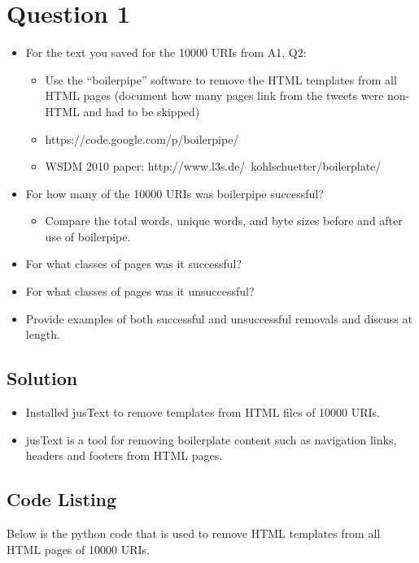 


\section{Question 1}
\label{part1}

\begin{itemize}
\item For the text you saved for the 10000 URIs from A1, Q2:
\begin{itemize}
\item Use the “boilerpipe” software to remove the HTML templates from all HTML pages (document how many pages link from the tweets were non-HTML and had to be skipped)
\item https://code.google.com/p/boilerpipe/
\item WSDM 2010 paper: http://www.l3s.de/~kohlschuetter/boilerplate/
\end{itemize}
\item For how many of the 10000 URIs was boilerpipe successful? 
\begin{itemize}
\item Compare the total words, unique words, and byte sizes before and after use of boilerpipe.
\end{itemize}
\item For what classes of pages was it successful?  
\item For what classes of pages was it unsuccessful?
\item Provide examples of both successful and unsuccessful removals and discuss at length.
\end{itemize}
\subsection{Solution}

\begin{itemize}
	\item Installed jusText\cite{jusText} to remove templates from HTML files of 10000 URIs.
	\item jusText is a tool for removing boilerplate content such as navigation links, headers and footers from HTML pages.
\end{itemize}

 \subsection{Code Listing}
Below is the python code that is used to remove HTML templates from all HTML pages of 10000 URIs.

